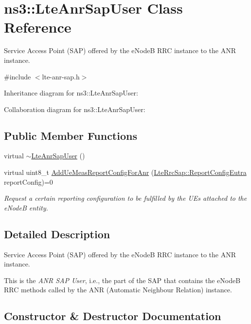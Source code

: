 \hypertarget{classns3_1_1LteAnrSapUser}{}\section{ns3\+:\+:Lte\+Anr\+Sap\+User Class Reference}
\label{classns3_1_1LteAnrSapUser}


Service Access Point (S\+AP) offered by the e\+NodeB R\+RC instance to the A\+NR instance.  




{\ttfamily \#include $<$lte-\/anr-\/sap.\+h$>$}



Inheritance diagram for ns3\+:\+:Lte\+Anr\+Sap\+User\+:


Collaboration diagram for ns3\+:\+:Lte\+Anr\+Sap\+User\+:
\subsection*{Public Member Functions}
\begin{DoxyCompactItemize}
\item 
virtual \hyperlink{classns3_1_1LteAnrSapUser_affe9bc7b2bf3ddeed51bf1f1847c4f60}{$\sim$\+Lte\+Anr\+Sap\+User} ()
\item 
virtual uint8\+\_\+t \hyperlink{classns3_1_1LteAnrSapUser_ac65225b3a8f1e011cc0ed2c99df4d139}{Add\+Ue\+Meas\+Report\+Config\+For\+Anr} (\hyperlink{structns3_1_1LteRrcSap_1_1ReportConfigEutra}{Lte\+Rrc\+Sap\+::\+Report\+Config\+Eutra} report\+Config)=0
\begin{DoxyCompactList}\small\item\em Request a certain reporting configuration to be fulfilled by the U\+Es attached to the e\+NodeB entity. \end{DoxyCompactList}\end{DoxyCompactItemize}


\subsection{Detailed Description}
Service Access Point (S\+AP) offered by the e\+NodeB R\+RC instance to the A\+NR instance. 

This is the {\itshape A\+NR S\+AP User}, i.\+e., the part of the S\+AP that contains the e\+NodeB R\+RC methods called by the A\+NR (Automatic Neighbour Relation) instance. 

\subsection{Constructor \& Destructor Documentation}
